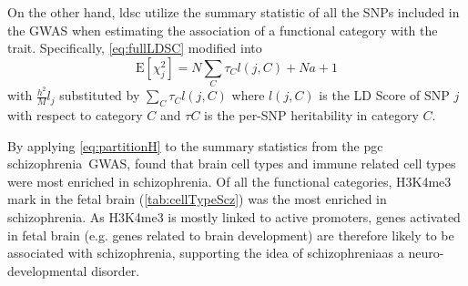 \documentclass[12pt]{scrbook}
\newcommand*{\scz}{schizophrenia}
\begin{document}
On the other hand, \gls{ldsc} utilize the summary statistic of all the \glspl{SNP} included in the \gls{GWAS} when estimating the association of a functional category with the trait.
Specifically, \cref{eq:fullLDSC} modified into
\begin{equation}
\mathrm{E}[\chi^2_j] = N\sum_C\tau_Cl(j,C)+Na+1
\label{eq:partitionH}
\end{equation}
with $\frac{h^2}{M}l_j$ substituted by $\sum_C\tau_Cl(j,C)$ where $l(j,C)$ is the \gls{LD} Score of \gls{SNP} $j$ with respect to category $C$ and $\tau C$ is the per-\gls{SNP} heritability in category $C$.

By applying \cref{eq:partitionH} to the summary statistics from the \gls{pgc} \scz\ \gls{GWAS}, \citet{Finucane2015} found that brain cell types and immune related cell types were most enriched in \scz.
Of all the functional categories, H3K4me3 mark in the fetal brain (\cref{tab:cellTypeScz}) was the most enriched in \scz.
As H3K4me3 is mostly linked to active promoters, genes activated in fetal brain (e.g. genes related to brain development) are therefore likely to be associated with \scz, supporting the idea of \scz as a neuro-developmental disorder. 
\end{document}
